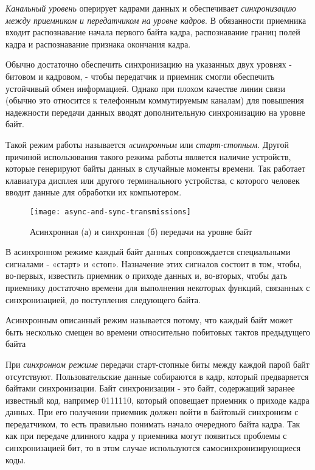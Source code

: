 \emph{Канальный уровень} оперирует кадрами данных и обеспечивает \emph{синхронизацию между приемником и передатчиком на уровне кадров}.
В обязанности приемника входит распознавание начала первого байта кадра, распознавание границ полей кадра и распознавание признака окончания кадра.

Обычно достаточно обеспечить синхронизацию на указанных двух уровнях - битовом и кадровом, - чтобы передатчик и приемник смогли обеспечить устойчивый обмен информацией.
Однако при плохом качестве линии связи (обычно это относится к телефонным коммутируемым каналам) для повышения надежности передачи данных вводят дополнительную синхронизацию на уровне байт.

Такой режим работы называется \emph{aсинхронным} или \emph{старт-стопным}.
Другой причиной использования такого режима работы является наличие устройств, которые генерируют байты данных в случайные моменты времени.
Так работает клавиатура дисплея или другого терминального устройства, с которого человек вводит данные для обработки их компьютером.

\begin{figure}[!ht]
    \centering
    \texttt{[image: async-and-sync-transmissions]}
    \caption{Асинхронная (а) и синхронная (б) передачи на уровне байт}
    \label{fig:async-and-sync-transmissions}
\end{figure}

В асинхронном режиме каждый байт данных сопровождается специальными сигналами - «старт» и «стоп».
Назначение этих сигналов состоит в том, чтобы, во-первых, известить приемник о приходе данных и, во-вторых, чтобы дать приемнику достаточно времени для выполнения некоторых функций, связанных с синхронизацией, до поступления следующего байта.

Асинхронным описанный режим называется потому, что каждый байт может быть несколько смещен во времени относительно побитовых тактов предыдущего байта

При \emph{синхронном режиме} передачи старт-стопные биты между каждой парой байт отсутствуют.
Пользовательские данные собираются в кадр, который предваряется байтами синхронизации.
Байт синхронизации - это байт, содержащий заранее известный код, например 0111110, который оповещает приемник о приходе кадра данных.
При его получении приемник должен войти в байтовый синхронизм с передатчиком, то есть правильно понимать начало очередного байта кадра.
Так как при передаче длинного кадра у приемника могут появиться проблемы с синхронизацией бит, то в этом случае используются самосинхронизирующиеся коды.
